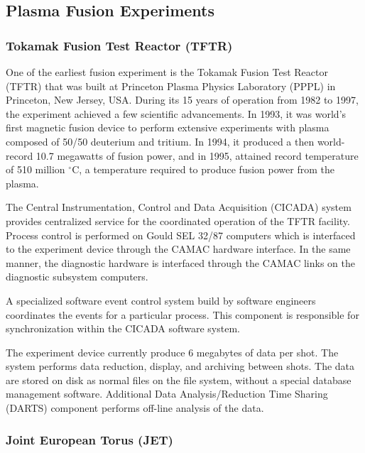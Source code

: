 
\subsection{Plasma Fusion Experiments}

\subsubsection{Tokamak Fusion Test Reactor (TFTR)}

One of the earliest fusion experiment is the Tokamak Fusion Test Reactor (TFTR) that was built at Princeton Plasma Physics Laboratory (PPPL) in Princeton, New Jersey, USA. During its 15 years of operation from 1982 to 1997, the experiment achieved a few scientific advancements. In 1993, it was world's first magnetic fusion device to perform extensive experiments with plasma composed of 50/50 deuterium and tritium\cite{PhysRevLett.72.3526}. In 1994, it produced a then world-record 10.7 megawatts of fusion power, and in 1995, attained record temperature of 510 million $^{\circ}$C, a temperature required to produce fusion power from the plasma\cite{534283}.

The Central Instrumentation, Control and Data Acquisition (CICADA) system provides centralized service for the coordinated operation of the TFTR facility\cite{:/content/aip/journal/rsi/56/5/10.1063/1.1138006}. Process control is performed on Gould SEL 32/87 computers which is interfaced to the experiment device through the CAMAC hardware interface. In the same manner, the diagnostic hardware is interfaced through the CAMAC links on the diagnostic subsystem computers.

A specialized software event control system build by software engineers coordinates the events for a particular process. This component is responsible for synchronization within the CICADA software system.

The experiment device currently produce 6 megabytes of data per shot. The system performs data reduction, display, and archiving between shots. The data are stored on disk as normal files on the file system, without a special database management software. Additional Data Analysis/Reduction Time Sharing (DARTS) component performs off-line analysis of the data.

\subsubsection{Joint European Torus (JET)}

